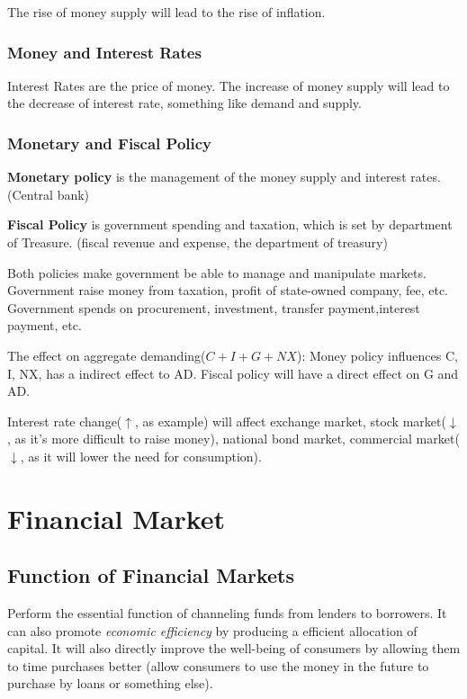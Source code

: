 \documentclass[10pt, a4paper]{article}
\begin{document}
                The rise of money supply will lead to the rise of inflation. 
            \subsubsection{Money and Interest Rates}
                Interest Rates are the price of money. The increase of money supply will lead to the decrease of interest rate, something like demand and supply.
            \subsubsection{Monetary and Fiscal Policy}
                \textbf{Monetary policy} is the management of the money supply and interest rates. (Central bank) 

                \textbf{Fiscal Policy} is government spending and taxation, which is set by department of Treasure. (fiscal revenue and expense, the department of treasury) 

                Both policies make government be able to manage and manipulate markets. Government raise money from taxation, profit of state-owned company, fee, etc. Government spends on procurement, investment, transfer payment,interest payment, etc. 

                The effect on aggregate demanding($C + I + G + NX$): Money policy influences C, I, NX, has a indirect effect to AD. Fiscal policy will have a direct effect on G and AD.  

                Interest rate change($\uparrow$, as example) will affect exchange market, stock market($\downarrow$, as it's more difficult to raise money), national bond market, commercial market($\downarrow$, as it will lower the need for consumption).
    
    \section{Financial Market}
        \subsection{Function of Financial Markets} 
            Perform the essential function of channeling funds from lenders to borrowers. It can also promote \emph{economic efficiency} by producing a efficient allocation of capital. It will also directly improve the well-being of consumers by allowing them to time purchases better (allow consumers to use the money in the future to purchase by loans or something else).
\end{document}
